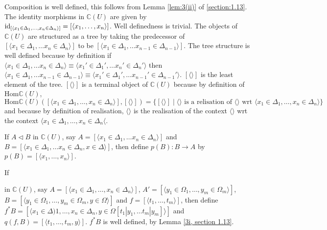 %
Composition is well defined, this follows from Lemma \ref{lem:3(ii)} of \ref{section:1.13}. The identity morphisms in \(\mathbb C (U)\) are given by $\operatorname{id}_{[\langle x_1 \in \Delta_1, \ldots, x_n \in \Delta_n \rangle]} = [\langle x_1, \ldots, x_n \rangle]$.
%
Well definedness is trivial.
%
% 
The objects of \(\mathbb C (U)\) are structured as a tree by taking the predecessor of \([\langle x_1 \in \Delta_1, \ldots x_n \in \Delta_n \rangle]\) to be \([\langle x_1 \in \Delta_1, \ldots x_{n-1} \in \Delta_{n-1} \rangle]\).
%
The tree structure is well defined because by definition if \(\langle x_1 \in \Delta_1, \ldots x_n \in \Delta_n \rangle \equiv \langle x_1' \in \Delta_1', \ldots x_n' \in \Delta_n' \rangle\) then \(\langle x_1 \in \Delta_1, \ldots x_{n-1} \in \Delta_{n-1} \rangle \equiv \langle x_1' \in \Delta_1', \ldots x_{n-1}' \in \Delta_{n-1}' \rangle\).
%
\([\langle  \rangle]\) is the least element of the tree.
%
\([\langle  \rangle]\) is a terminal object of \(\mathbb C(U)\) because by definition of \(\text{Hom}\mathbb C (U)\), \(\text{Hom}\mathbb C (U) ([\langle x_1 \in \Delta_1, \ldots, x_n \in \Delta_n \rangle], [\langle  \rangle]) = \{[\langle  \rangle] \mid \langle  \rangle \text{ is a relisation of } \langle  \rangle \text{ wrt } \langle x_1 \in \Delta_1, \ldots, x_n \in \Delta_n \rangle\}\) and because by definition of realisation, \(\langle \rangle\) is the realisation of the context \(\langle \rangle\) wrt the context \( \langle x_1 \in \Delta_1, \ldots, x_n \in \Delta_n \langle \).

If \(A \triangleleft B\) in \(\mathbb C (U)\), say \(A = [\langle x_1 \in \Delta_1, \ldots x_n \in \Delta_n \rangle]\) and \(B = [\langle x_1 \in \Delta_1, \ldots x_n \in \Delta_n, x \in \Delta \rangle]\), then define \(p(B):B \rightarrow A\) by \(p(B) = [\langle x_1, \ldots, x_n \rangle]\).

If
\begin{center}
\end{center}

in \(\mathbb C (U)\), say \(A = [\langle x_1 \in \Delta_1, \ldots, x_n \in \Delta_n \rangle]\), \(A' = [\langle y_1 \in \Omega_1, \ldots, y_m \in \Omega_m \rangle]\), \(B = [\langle y_1 \in \Omega_1, \ldots, y_m \in \Omega_m, y \in \Omega \rangle]\) and \(f = [\langle t_1, \ldots, t_m \rangle]\), then define \(f^*B=[\langle x_1 \in \Delta)1, \ldots, x_n \in \Delta_n, y \in \Omega[t_1|y_1, \ldots t_m|y_m] \rangle]\) and \(q(f,B) = [\langle t_1, \ldots, t_m, y \rangle]\).
%
\(f^*B\) is well defined, by Lemma \ref{3i, section 1.13}. 

